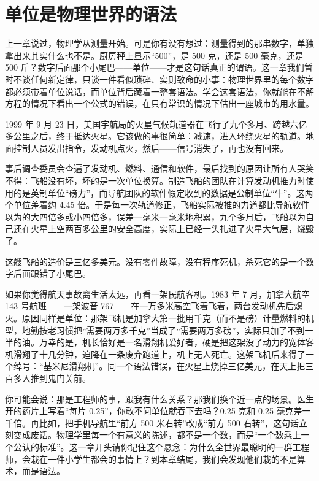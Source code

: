 \chapter{单位是物理世界的语法}

上一章说过，物理学从测量开始。可是你有没有想过：测量得到的那串数字，单独拿出来其实什么也不是。厨房秤上显示“500”，是 500 克，还是 500 毫克，还是 500 斤？数字后面那个小尾巴——单位——才是这句话真正的谓语。这一章我们暂时不谈任何新定律，只谈一件看似琐碎、实则致命的小事：物理世界里的每个数字都必须带着单位说话，而单位背后藏着一整套语法。学会这套语法，你就能在不解方程的情况下看出一个公式的错误，在只有常识的情况下估出一座城市的用水量。


1999 年 9 月 23 日，美国宇航局的火星气候轨道器在飞行了九个多月、跨越六亿多公里之后，终于抵达火星。它该做的事很简单：减速，进入环绕火星的轨道。地面控制人员发出指令，发动机点火，然后——信号消失了，再也没有回来。

事后调查委员会查遍了发动机、燃料、通信和软件，最后找到的原因让所有人哭笑不得：飞船没有坏，坏的是一次单位换算。制造飞船的团队在计算发动机推力时使用的是英制单位“磅力”，而导航团队的软件假定收到的数据是公制单位“牛”。这两个单位差着约 4.45 倍。于是每一次轨道修正，飞船实际被推的力道都比导航软件以为的大四倍多或小四倍多，误差一毫米一毫米地积累，九个多月后，飞船以为自己还在火星上空两百多公里的安全高度，实际上已经一头扎进了火星大气层，烧毁了。

这艘飞船的造价是三亿多美元。没有零件故障，没有程序死机，杀死它的是一个数字后面跟错了小尾巴。

如果你觉得航天事故离生活太远，再看一架民航客机。1983 年 7 月，加拿大航空 143 号航班——一架波音 767——在一万多米高空飞着飞着，两台发动机先后熄火。原因同样是单位：那架飞机是加拿大第一批用千克（而不是磅）计量燃料的机型，地勤按老习惯把“需要两万多千克”当成了“需要两万多磅”，实际只加了不到一半的油。万幸的是，机长恰好是一名滑翔机爱好者，硬是把这架没了动力的宽体客机滑翔了十几分钟，迫降在一条废弃跑道上，机上无人死亡。这架飞机后来得了一个绰号：“基米尼滑翔机”。同一个语法错误，在火星上烧掉三亿美元，在天上把三百多人推到鬼门关前。

你可能会说：那是工程师的事，跟我有什么关系？那我们换个近一点的场景。医生开的药片上写着“每片 0.25”，你敢不问单位就吞下去吗？0.25 克和 0.25 毫克差一千倍。再比如，把手机导航里“前方 500 米右转”改成“前方 500 右转”，这句话立刻变成废话。物理学里每一个有意义的陈述，都不是一个数，而是“一个数乘上一个公认的标准”。这一章开头请你记住这个悬念：为什么全世界最聪明的一群工程师，会栽在一件小学生都会的事情上？到本章结尾，我们会发现他们栽的不是算术，而是语法。

